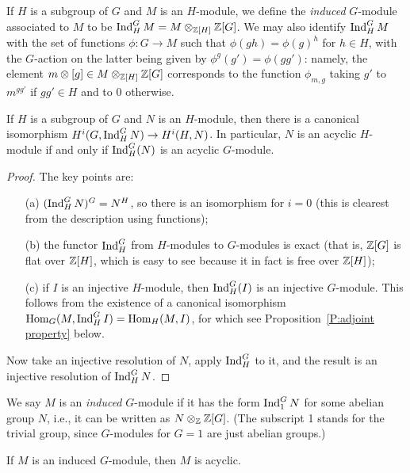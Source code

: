 If $H$ is a subgroup of $G$ and $M$ is an $H$-module, 
we define the \emph{induced} $G$-module associated to $M$ to be 
$\operatorname{Ind}^G_H M = M \otimes_{\mathbb{Z}[H]} \mathbb{Z}[G]$. We may also identify $\operatorname{Ind}^G_H M$ with the set of functions $\phi: G \to M$ such that $\phi(gh)
= \phi(g)^h$ for $h \in H$, with the $G$-action on the latter being given by 
$\phi^g(g') = \phi(gg')$: namely, the element $m \otimes [g] \in M \otimes_{\mathbb{Z}[H]} \mathbb{Z}[G]$ corresponds to the function $\phi_{m,g}$ taking $g'$ to $m^{gg'}$ if $gg' \in H$ and to 0 otherwise.

\begin{lemma} \label{L:Shapiro}
  If $H$ is a subgroup of $G$ and $N$ is an $H$-module, then
there is a canonical isomorphism $H^i(G, \operatorname{Ind}^G_H N) \to H^i(H, N)$.
In particular, $N$ is an acyclic $H$-module if and only if
$\operatorname{Ind}^G_H(N)$ is an acyclic $G$-module.
\end{lemma}
\begin{proof}
The key points are:
\begin{enumerate}
\item[(a)] $(\operatorname{Ind}^G_H N)^G = N^H$, so there is an isomorphism for $i=0$
(this is clearest from the description using functions);
\item[(b)] the functor $\operatorname{Ind}^G_H$ from $H$-modules to $G$-modules
is exact (that is, $\mathbb{Z}[G]$ is flat over $\mathbb{Z}[H]$, which is easy to see
because it in fact is free over $\mathbb{Z}[H]$);
\item[(c)] if $I$ is an injective $H$-module, then $\operatorname{Ind}^G_H(I)$ is an
injective $G$-module. This follows from the existence of a  canonical
isomorphism $\operatorname{Hom}_G(M, \operatorname{Ind}^G_H I) = \operatorname{Hom}_H(M, I)$, for which see Proposition~\ref{P:adjoint property} below.
\end{enumerate}
Now take an injective resolution of $N$, apply $\operatorname{Ind}^G_H$ to it, and the
result is an injective resolution of $\operatorname{Ind}^G_H N$.
\end{proof}
We say $M$ is an \emph{induced} $G$-module if it has the form $\operatorname{Ind}^G_{1}
N$
for some abelian group $N$, i.e.,
it can be written as $N \otimes_{\mathbb{Z}} \mathbb{Z}[G]$. (The subscript 1 stands for the trivial group, since $G$-modules for $G = 1$ are just abelian groups.)


\begin{cor} \label{C:induced acyclic}
If $M$ is an induced $G$-module, then $M$ is acyclic.
\end{cor}

